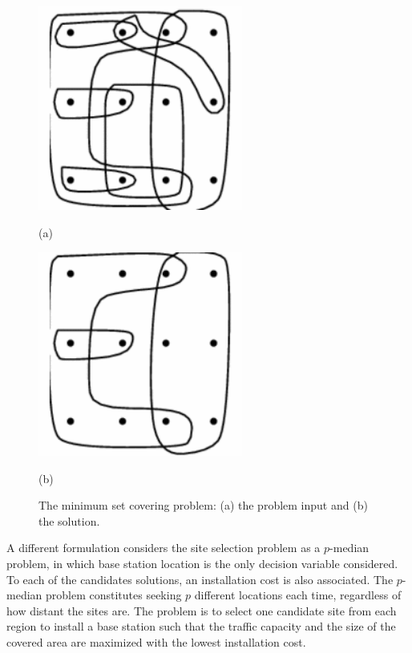 \begin{figure}[H]
\centering

\begin{minipage}[c]{0.45\textwidth}%
\centering

\includegraphics[width=0.6\textwidth]{02-background_and_motivation/img/set_cover_in}

(a)%
\end{minipage}\hfill{}%
\begin{minipage}[c]{0.45\textwidth}%
\centering

\includegraphics[width=0.6\textwidth]{02-background_and_motivation/img/set_cover_out}

(b)%
\end{minipage}\caption{The minimum set covering problem: (a) the problem input and (b) the
solution.\label{fig:The-minimum-set}}
\end{figure}


A different formulation considers the site selection problem as a
$p$-median problem, in which base station location is the only decision
variable considered. To each of the candidates solutions, an installation
cost is also associated. The $p$-median problem constitutes seeking
$p$ different locations each time, regardless of how distant the
sites are. The problem is to select one candidate site from each region
to install a base station such that the traffic capacity and the size
of the covered area are maximized with the lowest installation cost.


